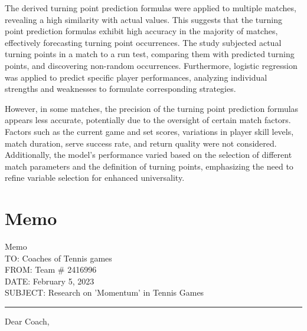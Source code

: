 \documentclass[UTF8]{ctexart} %
\begin{document}
The derived turning point prediction formulas were applied to multiple matches, revealing a high similarity with actual values. This suggests that the turning point prediction formulas exhibit high accuracy in the majority of matches, 
effectively forecasting turning point occurrences. The study subjected actual turning points in a match to a run test, comparing them with predicted turning points, 
and discovering non-random occurrences. Furthermore, logistic regression was applied to predict specific player performances, 
analyzing individual strengths and weaknesses to formulate corresponding strategies.

However, in some matches, the precision of the turning point prediction formulas appears less accurate, potentially due to the oversight of certain match factors. 
Factors such as the current game and set scores, variations in player skill levels, match duration, serve success rate, and return quality were not considered. 
Additionally, the model's performance varied based on the selection of different match parameters and the definition of turning points, 
emphasizing the need to refine variable selection for enhanced universality.



\section{Memo}

\noindent Memo \\
TO: Coaches of Tennis games \\
FROM: Team \# 2416996 \\
DATE: February 5, 2023 \\
SUBJECT: Research on 'Momentum' in Tennis Games \\
\hrule
\vspace{0.5cm}
\noindent Dear Coach,
\end{document}
